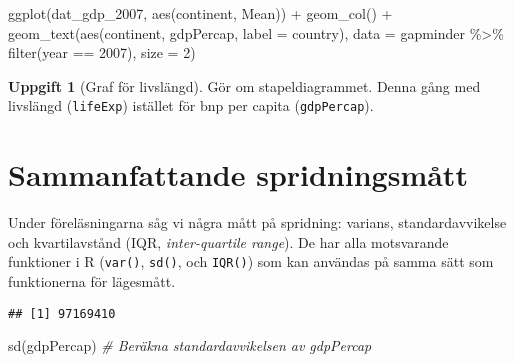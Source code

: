 \documentclass[
]{book}
\newenvironment{Shaded}{\begin{snugshade}}{\end{snugshade}}
\newcommand{\AttributeTok}[1]{\textcolor[rgb]{0.77,0.63,0.00}{#1}}
\newcommand{\CommentTok}[1]{\textcolor[rgb]{0.56,0.35,0.01}{\textit{#1}}}
\newcommand{\DecValTok}[1]{\textcolor[rgb]{0.00,0.00,0.81}{#1}}
\newcommand{\FunctionTok}[1]{\textcolor[rgb]{0.00,0.00,0.00}{#1}}
\newcommand{\NormalTok}[1]{#1}
\newcommand{\OtherTok}[1]{\textcolor[rgb]{0.56,0.35,0.01}{#1}}
\newcommand{\SpecialCharTok}[1]{\textcolor[rgb]{0.00,0.00,0.00}{#1}}
\theoremstyle{definition}
\theoremstyle{definition}
\theoremstyle{definition}
\newtheorem{exercise}{Uppgift}[chapter]
\theoremstyle{definition}
\theoremstyle{remark}
\begin{document}
\begin{Shaded}
\begin{Highlighting}[]
\FunctionTok{ggplot}\NormalTok{(dat\_gdp\_2007, }\FunctionTok{aes}\NormalTok{(continent, Mean)) }\SpecialCharTok{+}
  \FunctionTok{geom\_col}\NormalTok{() }\SpecialCharTok{+}
  \FunctionTok{geom\_text}\NormalTok{(}\FunctionTok{aes}\NormalTok{(continent, gdpPercap, }\AttributeTok{label =}\NormalTok{ country), }\AttributeTok{data =}\NormalTok{ gapminder }\SpecialCharTok{\%\textgreater{}\%} \FunctionTok{filter}\NormalTok{(year }\SpecialCharTok{==} \DecValTok{2007}\NormalTok{), }\AttributeTok{size =} \DecValTok{2}\NormalTok{)}
\end{Highlighting}
\end{Shaded}

\begin{exercise}[Graf för livslängd]
Gör om stapeldiagrammet. Denna gång med livslängd (\texttt{lifeExp}) istället för bnp per capita (\texttt{gdpPercap}).
\end{exercise}

\hypertarget{sammanfattande-spridningsmuxe5tt}{%
\section{Sammanfattande spridningsmått}\label{sammanfattande-spridningsmuxe5tt}}

Under föreläsningarna såg vi några mått på spridning: varians, standardavvikelse och kvartilavstånd (IQR, \emph{inter-quartile range}). De har alla motsvarande funktioner i R (\texttt{var()}, \texttt{sd()}, och \texttt{IQR()}) som kan användas på samma sätt som funktionerna för lägesmått.

\begin{Shaded}
\end{Shaded}

\begin{verbatim}
## [1] 97169410
\end{verbatim}

\begin{Shaded}
\begin{Highlighting}[]
\FunctionTok{sd}\NormalTok{(gdpPercap)                                    }\CommentTok{\# Beräkna standardavvikelsen av gdpPercap}
\end{Highlighting}
\end{Shaded}
\end{document}
